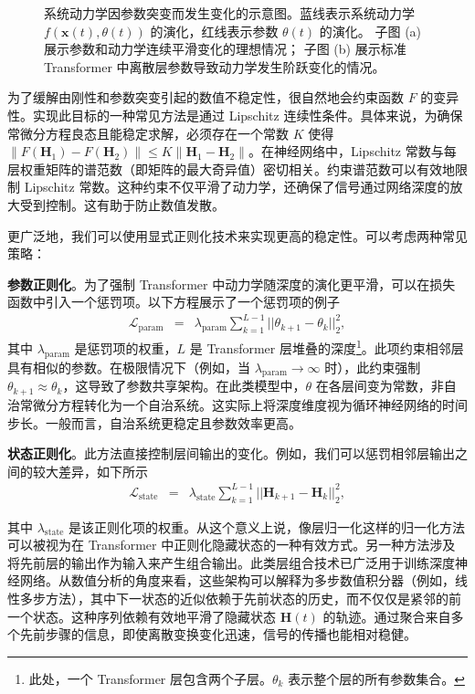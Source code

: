 \documentclass[UTF8,a4paper,zihao=-4,oneside,openany]{ctexbook}
\makeatletter
\newcommand{\AMLFigure}[2][0.96\linewidth]{%
  \begingroup
  \let\AtBeginDocument\@gobble
  \endgroup
}
\makeatother
\begin{document}
\begin{figure}[!t]
\centering
\AMLFigure{figure-system-dynamics-shift-vs-parameter-change}
\caption{系统动力学因参数突变而发生变化的示意图。蓝线表示系统动力学
$f(\mathbf{x}(t),\theta(t))$ 的演化，红线表示参数 $\theta(t)$ 的演化。
子图 (a) 展示参数和动力学连续平滑变化的理想情况；
子图 (b) 展示标准 Transformer 中离散层参数导致动力学发生阶跃变化的情况。}
\label{fig:dynamics-caused-by-changes-in-parameters}
\end{figure}

为了缓解由刚性和参数突变引起的数值不稳定性，很自然地会约束函数 $F$ 的变异性。实现此目标的一种常见方法是通过 Lipschitz 连续性条件。具体来说，为确保常微分方程良态且能稳定求解，必须存在一个常数 $K$ 使得 $\|F(\mathbf{H}_1) - F(\mathbf{H}_2)\| \le K \|\mathbf{H}_1 - \mathbf{H}_2\|$。在神经网络中，Lipschitz 常数与每层权重矩阵的谱范数（即矩阵的最大奇异值）密切相关。约束谱范数可以有效地限制 Lipschitz 常数。这种约束不仅平滑了动力学，还确保了信号通过网络深度的放大受到控制。这有助于防止数值发散。

更广泛地，我们可以使用显式正则化技术来实现更高的稳定性。可以考虑两种常见策略：

\textbf{参数正则化}。为了强制 Transformer 中动力学随深度的演化更平滑，可以在损失函数中引入一个惩罚项。以下方程展示了一个惩罚项的例子
\begin{eqnarray}
\mathcal{L}_{\text{param}} & = & \lambda_{\text{param}} \sum_{k=1}^{L-1} || \theta_{k+1} - \theta_{k} ||_2^2,
\end{eqnarray}
\noindent 其中 $\lambda_{\text{param}}$ 是惩罚项的权重，$L$ 是 Transformer 层堆叠的深度\footnote{此处，一个 Transformer 层包含两个子层。$\theta_k$ 表示整个层的所有参数集合。}。此项约束相邻层具有相似的参数。在极限情况下（例如，当 $\lambda_{\text{param}} \to \infty$ 时），此约束强制 $\theta_{k+1} \approx \theta_k$，这导致了参数共享架构。在此类模型中，$\theta$ 在各层间变为常数，非自治常微分方程转化为一个自治系统。这实际上将深度维度视为循环神经网络的时间步长。一般而言，自治系统更稳定且参数效率更高。

\textbf{状态正则化}。此方法直接控制层间输出的变化。例如，我们可以惩罚相邻层输出之间的较大差异，如下所示
\begin{eqnarray}
\mathcal{L}_{\text{state}} & = & \lambda_{\text{state}} \sum_{k=1}^{L-1} || \mathbf{H}_{k+1} - \mathbf{H}_{k} ||_2^2,
\end{eqnarray}

其中 $\lambda_{\text{state}}$ 是该正则化项的权重。从这个意义上说，像层归一化这样的归一化方法可以被视为在 Transformer 中正则化隐藏状态的一种有效方式。另一种方法涉及将先前层的输出作为输入来产生组合输出。此类层组合技术已广泛用于训练深度神经网络。从数值分析的角度来看，这些架构可以解释为多步数值积分器（例如，线性多步方法），其中下一状态的近似依赖于先前状态的历史，而不仅仅是紧邻的前一个状态。这种序列依赖有效地平滑了隐藏状态 $\mathbf{H}(t)$ 的轨迹。通过聚合来自多个先前步骤的信息，即使离散变换变化迅速，信号的传播也能相对稳健。
\end{document}
